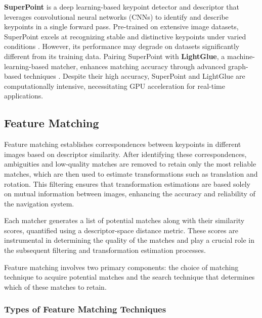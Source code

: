 \textbf{SuperPoint} is a deep learning-based keypoint detector and descriptor that leverages convolutional neural networks (CNNs) to identify and describe keypoints in a single forward pass. Pre-trained on extensive image datasets, SuperPoint excels at recognizing stable and distinctive keypoints under varied conditions \cite{rpaultrat2023superpoint}. However, its performance may degrade on datasets significantly different from its training data. Pairing SuperPoint with \textbf{LightGlue}, a machine-learning-based matcher, enhances matching accuracy through advanced graph-based techniques \cite{cvg2023lightglue}. Despite their high accuracy, SuperPoint and LightGlue are computationally intensive, necessitating GPU acceleration for real-time applications.





\subsection{Feature Matching}

Feature matching establishes correspondences between keypoints in different images based on descriptor similarity. After identifying these correspondences, ambiguities and low-quality matches are removed to retain only the most reliable matches, which are then used to estimate transformations such as translation and rotation. This filtering ensures that transformation estimations are based solely on mutual information between images, enhancing the accuracy and reliability of the navigation system.

Each matcher generates a list of potential matches along with their similarity scores, quantified using a descriptor-space distance metric. These scores are instrumental in determining the quality of the matches and play a crucial role in the subsequent filtering and transformation estimation processes.

Feature matching involves two primary components: the choice of matching technique to acquire potential matches and the search technique that determines which of these matches to retain. 

\subsubsection{Types of Feature Matching Techniques}

